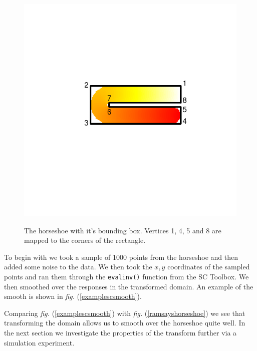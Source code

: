 \documentclass[a4paper,10pt]{amsart}
\newcommand{\fig}[1]{\emph{fig.} (\ref{#1})}
\begin{document}
\begin{figure}
\centering
\includegraphics[trim=0in 1.5in 0in 1.5in]{figs/hswithboundingbox.pdf} \\
\caption{The horseshoe with it's bounding box. Vertices 1, 4, 5 and 8 are mapped to the corners of the rectangle.}
\label{hswithboundingbox}
\end{figure}

To begin with we took a sample of 1000 points from the horseshoe and then added some noise to the data. We then took the $x,y$ coordinates of the sampled points and ran them through the \texttt{evalinv()} function from the SC Toolbox. We then smoothed over the responses in the transformed domain. An example of the smooth is shown in \fig{examplescsmooth}.

Comparing \fig{examplescsmooth} with \fig{ramsayshorseshoe} we see that transforming the domain allows us to smooth over the horseshoe quite well. In the next section we investigate the properties of the transform further via a simulation experiment.
\end{document}
